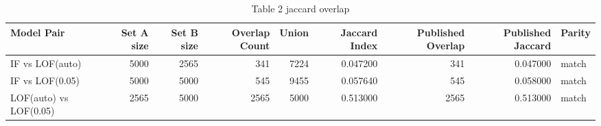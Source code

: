 \begin{table}
\caption{Table 2 jaccard overlap}
\label{tab:table_2_jaccard_overlap}
\begin{tabular}{lrrrrrrrl}
\toprule
Model Pair & Set A size & Set B size & Overlap Count & Union & Jaccard Index & Published Overlap & Published Jaccard & Parity \\
\midrule
IF vs LOF(auto) & 5000 & 2565 & 341 & 7224 & 0.047200 & 341 & 0.047000 & match \\
IF vs LOF(0.05) & 5000 & 5000 & 545 & 9455 & 0.057640 & 545 & 0.058000 & match \\
LOF(auto) vs LOF(0.05) & 2565 & 5000 & 2565 & 5000 & 0.513000 & 2565 & 0.513000 & match \\
\bottomrule
\end{tabular}
\end{table}
